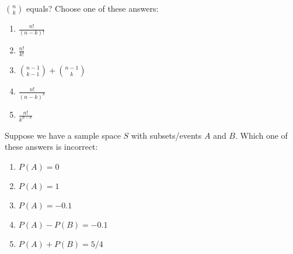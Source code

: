 \documentclass[poll_tutorial_format]{subfiles}
\begin{document}
	
	\begin{exercise}
		${n\choose k}$ equals?
		Choose one of these answers:%
		\begin{enumerate}
			\item $\frac{n!}{(n-k)!}$
			\item $\frac{n!}{k!}$
			\item ${n-1\choose k-1} +{n-1\choose k}$
			\item $\frac{n!}{(n-k)^k}$
			\item $\frac{n!}{k^{n-k}}$
		\end{enumerate}
	\end{exercise}
	
	\begin{exercise}
		Suppose we have a sample space $S$ with subsets/events $A$ and $B$.
			Which one of these answers is incorrect:%
		\begin{enumerate}
			\item $P(A)=0$
			\item $P(A)=1$
			\item $P(A)=-0.1$
			\item $P(A)-P(B)=-0.1$
			\item $P(A)+P(B)=5/4$
		\end{enumerate}
	\end{exercise}
	 
  
 
 
\end{document}
